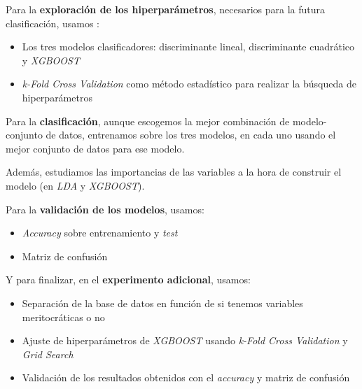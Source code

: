 \documentclass[11pt]{article}
\begin{document}
Para la \textbf{exploración de los hiperparámetros}, necesarios para la futura clasificación, usamos \footnotemark:


\begin{itemize}
    \item Los tres modelos clasificadores: discriminante lineal, discriminante cuadrático y \textit{XGBOOST}
    \item \textit{k-Fold Cross Validation} como método estadístico para realizar la búsqueda de hiperparámetros
\end{itemize}

Para la \textbf{clasificación}, aunque escogemos la mejor combinación de modelo-conjunto de datos, entrenamos sobre los tres modelos, en cada uno usando el mejor conjunto de datos para ese modelo.

Además, estudiamos las importancias de las variables a la hora de construir el modelo (en \textit{LDA} y \textit{XGBOOST}).

Para la \textbf{validación de los modelos}, usamos:

\begin{itemize}
    \item \textit{Accuracy} sobre entrenamiento y \textit{test}
    \item Matriz de confusión
\end{itemize}

Y para finalizar, en el \textbf{experimento adicional}, usamos:

\begin{itemize}
    \item Separación de la base de datos en función de si tenemos variables meritocráticas o no
    \item Ajuste de hiperparámetros de \textit{XGBOOST} usando \textit{k-Fold Cross Validation} y \textit{Grid Search}
    \item Validación de los resultados obtenidos con el \textit{accuracy} y matriz de confusión
\end{itemize}


\newpage


\newpage


\newpage


\newpage

\pagebreak





\end{document}
